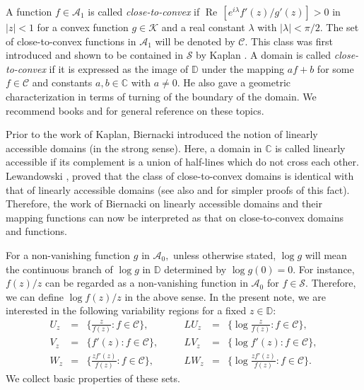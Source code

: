 \documentclass[a4paper,12pt]{amsart}
\numberwithin{equation}{section}
\theoremstyle{definition}
\begin{document}
A function $f\in{{\mathcal A}}_1$ is called {\it close-to-convex} if
${{\operatorname{Re}\,}}[e^{i\lambda}f'(z)/g'(z)]>0$ in $|z|<1$ for a convex function
$g\in{{\mathcal K}}$ and a real constant $\lambda$ with $|\lambda|<\pi/2.$
The set of close-to-convex functions in ${{\mathcal A}}_1$ will be denoted by ${{\mathcal C}}.$
This class was first introduced and shown to be contained in ${{\mathcal S}}$
by Kaplan \cite{Kaplan52}.
A domain is called {\it close-to-convex} if it is expressed as the
image of ${{\mathbb D}}$ under the mapping $af+b$ for some $f\in{{\mathcal C}}$ and
constants $a, b\in{{\mathbb C}}$ with $a\ne0.$
He also gave a geometric characterization in terms of turning of
the boundary of the domain.
We recommend books \cite{Duren:univ} and \cite{Goodman:univ} for general
reference on these topics.

Prior to the work of Kaplan, Biernacki \cite{Bier36} introduced the
notion of linearly accessible domains (in the strong sense).
Here, a domain in ${{\mathbb C}}$ is called linearly accessible if
its complement is a union of half-lines which do not cross each other.
Lewandowski \cite{lew58}, \cite{lew60} proved that the class of close-to-convex
domains is identical with that of linearly accessible domains
(see also \cite{BL62} and \cite{Koepf89} for simpler proofs of this fact).
Therefore, the work of Biernacki on linearly accessible domains and
their mapping functions can now be interpreted as that on close-to-convex
domains and functions.

For a non-vanishing function $g$ in ${{\mathcal A}}_0,$ unless otherwise stated,
$\log g$ will mean
the continuous branch of $\log g$ in ${{\mathbb D}}$ determined by $\log g(0)=0.$
For instance, $f(z)/z$ can be regarded as a non-vanishing function
in ${{\mathcal A}}_0$ for $f\in{{\mathcal S}}.$
Therefore, we can define $\log f(z)/z$ in the above sense.
In the present note, we are interested in the following variability regions
for a fixed $z\in{{\mathbb D}}:$
$$
\begin{array}{cclcccl}
U_z&=&\{\tfrac z{f(z)}: f\in{{\mathcal C}}\},&
\quad&
LU_z&=&\{\log\tfrac z{f(z)}: f\in{{\mathcal C}}\},
\\
V_z&=&\{f'(z): f\in{{\mathcal C}}\},&
\quad&
LV_z&=&\{\log f'(z): f\in{{\mathcal C}}\},
\\
W_z&=&\{\tfrac {zf'(z)}{f(z)}: f\in{{\mathcal C}}\},&
\quad&
LW_z&=&\{\log\tfrac {zf'(z)}{f(z)}: f\in{{\mathcal C}}\}.
\end{array}
$$
We collect basic properties of these sets.
\end{document}
